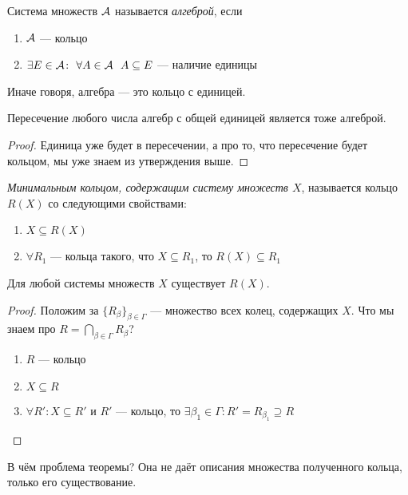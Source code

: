 \begin{definition}
	Система множеств $\mathcal{A}$ называется \textit{алгеброй}, если
	\begin{enumerate}
		\item $\mathcal{A}$ --- кольцо
		
		\item $\exists E \in \mathcal{A} \colon\ \forall A \in \mathcal{A}\ \ A \subseteq E$ --- наличие единицы
	\end{enumerate}
	Иначе говоря, алгебра --- это кольцо с единицей.
\end{definition}

\begin{proposition}
	Пересечение любого числа алгебр с общей единицей является тоже алгеброй.
\end{proposition}

\begin{proof}
	Единица уже будет в пересечении, а про то, что пересечение будет кольцом, мы уже знаем из утверждения выше.
\end{proof}

\begin{definition}
	\textit{Минимальным кольцом, содержащим систему множеств $X$}, называется кольцо $R(X)$ со следующими свойствами:
	\begin{enumerate}
		\item $X \subseteq R(X)$
		
		\item $\forall R_1$ --- кольца такого, что $X \subseteq R_1$, то $R(X) \subseteq R_1$
	\end{enumerate}
\end{definition}

\begin{theorem}
	Для любой системы множеств $X$ существует $R(X)$.
\end{theorem}

\begin{proof}
	Положим за $\{R_\beta\}_{\beta \in \Gamma}$ --- множество всех колец, содержащих $X$. Что мы знаем про $R = \bigcap_{\beta \in \Gamma} R_\beta$?
	\begin{enumerate}
		\item $R$ --- кольцо
		
		\item $X \subseteq R$
		
		\item $\forall R' \colon X \subseteq R'$ и $R'$ --- кольцо, то $\exists \beta_1 \in \Gamma \colon R' = R_{\beta_1} \supseteq R$
	\end{enumerate}
\end{proof}

\begin{note}
	В чём проблема теоремы? Она не даёт описания множества полученного кольца, только его существование.
\end{note}